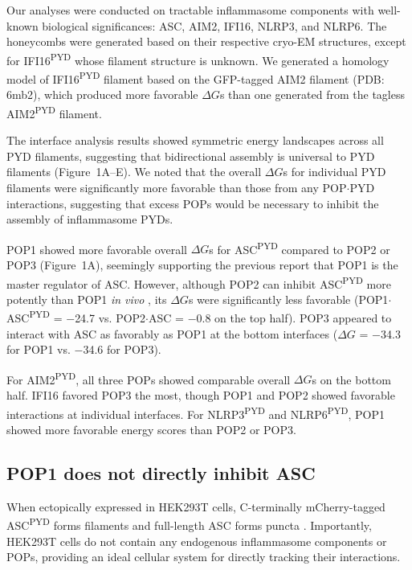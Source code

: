 \documentclass[11pt]{article}
\begin{document}
Our analyses were conducted on tractable inflammasome components with well-known biological significances: ASC, AIM2, IFI16, NLRP3, and NLRP6. The honeycombs were generated based on their respective cryo-EM structures, except for IFI16\textsuperscript{PYD} whose filament structure is unknown. We generated a homology model of IFI16\textsuperscript{PYD} filament based on the GFP-tagged AIM2 filament (PDB: 6mb2), which produced more favorable $\Delta G$s than one generated from the tagless AIM2\textsuperscript{PYD} filament.

The interface analysis results showed symmetric energy landscapes across all PYD filaments, suggesting that bidirectional assembly is universal to PYD filaments (Figure~1A--E). We noted that the overall $\Delta G$s for individual PYD filaments were significantly more favorable than those from any POP$\cdot$PYD interactions, suggesting that excess POPs would be necessary to inhibit the assembly of inflammasome PYDs.

POP1 showed more favorable overall $\Delta G$s for ASC\textsuperscript{PYD} compared to POP2 or POP3 (Figure~1A), seemingly supporting the previous report that POP1 is the master regulator of ASC. However, although POP2 can inhibit ASC\textsuperscript{PYD} more potently than POP1 \textit{in vivo} \citep{ratsimandresy2017pop2}, its $\Delta G$s were significantly less favorable (POP1$\cdot$ASC\textsuperscript{PYD} = $-$24.7 vs. POP2$\cdot$ASC = $-$0.8 on the top half). POP3 appeared to interact with ASC as favorably as POP1 at the bottom interfaces ($\Delta G$ = $-$34.3 for POP1 vs. $-$34.6 for POP3).

For AIM2\textsuperscript{PYD}, all three POPs showed comparable overall $\Delta G$s on the bottom half. IFI16 favored POP3 the most, though POP1 and POP2 showed favorable interactions at individual interfaces. For NLRP3\textsuperscript{PYD} and NLRP6\textsuperscript{PYD}, POP1 showed more favorable energy scores than POP2 or POP3.

\subsection{POP1 does not directly inhibit ASC}

When ectopically expressed in HEK293T cells, C-terminally mCherry-tagged ASC\textsuperscript{PYD} forms filaments and full-length ASC forms puncta \citep{matyszewski2021directionality}. Importantly, HEK293T cells do not contain any endogenous inflammasome components or POPs, providing an ideal cellular system for directly tracking their interactions.
\end{document}
